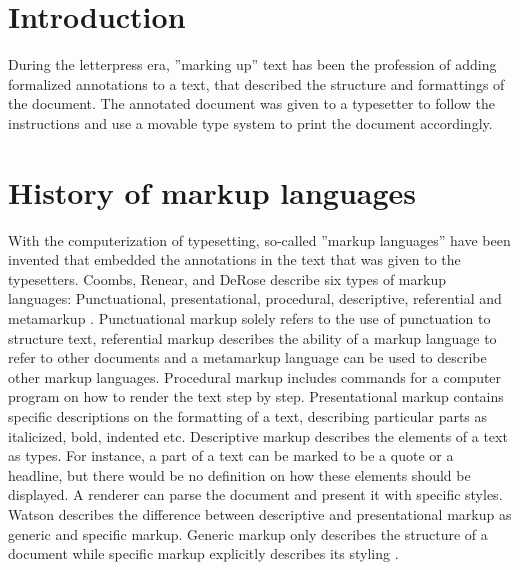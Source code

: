 \section{Introduction}

During the letterpress era, ''marking up'' text has been the profession of adding formalized annotations to a text, that described the structure and formattings of the document. The annotated document was given to a typesetter to follow the instructions and use a movable type system to print the document accordingly.

\section{History of markup languages}

With the computerization of typesetting, so-called ''markup languages'' have been invented that embedded the annotations in the text that was given to the typesetters. Coombs, Renear, and DeRose describe six types of markup languages: Punctuational, presentational, procedural, descriptive, referential and metamarkup \cite{Coombs:1987:MSF:32206.32209}. Punctuational markup solely refers to the use of punctuation to structure text, referential markup describes the ability of a markup language to refer to other documents and a metamarkup language can be used to describe other markup languages. Procedural markup includes commands for a computer program on how to render the text step by step. Presentational markup contains specific descriptions on the formatting of a text, describing particular parts as italicized, bold, indented etc. Descriptive markup describes the elements of a text as types. For instance, a part of a text can be marked to be a quote or a headline, but there would be no definition on how these elements should be displayed. A renderer can parse the document and present it with specific styles. Watson describes the difference between descriptive and presentational markup as generic and specific markup. Generic markup only describes the structure of a document while specific markup explicitly describes its styling \cite{watsonhistory}. 

